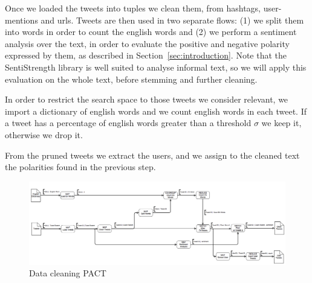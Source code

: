 Once we loaded the tweets into tuples we clean them, from hashtags, user-mentions and urls. 
Tweets are then used in two separate flows: (1) we split them into words in order to count the english words and (2) we perform a sentiment analysis over the text, in order to evaluate the positive and negative polarity expressed by them, as described in Section~\ref{sec:introduction}.
Note that the SentiStrength library is well suited to analyse informal text, so we will apply this evaluation on the whole text, before stemming and further cleaning. 

In order to restrict the search space to those tweets we consider relevant, we import a dictionary of english words and we count english words in each tweet. 
If a tweet has a percentage of english words greater than a threshold $\sigma$ we keep it, otherwise we drop it. 

From the pruned tweets we extract the users, and we assign to the cleaned text the polarities found in the previous step. 

\begin{figure}[ht]
\includegraphics[width=\textwidth]{images/strato_pact_pt1.png} 
\caption{Data cleaning PACT}
\label{fig:cleaning}
\end{figure}

